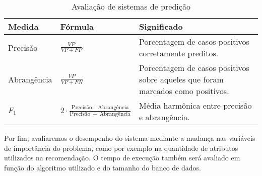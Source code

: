 

\begin{table}[htp]
\begin{center}
    \caption{Avaliação de sistemas de predição}
    \label{tab:avaliacao-predicao}
    \begin{tabular}{  | >{\arraybackslash} m{3cm} | >{\centering\arraybackslash} m{4cm} | >{\arraybackslash} m{6cm} | }
    \hline
    \textbf{Medida} & \textbf{Fórmula} & \textbf{Significado} \\ \hline
    Precisão &  $\frac{VP}{VP+FP}$ & Porcentagem de casos positivos corretamente preditos. \\ \hline                            
    Abrangência & $\frac{VP}{VP+FN}$ & Porcentagem de casos positivos sobre aqueles que foram marcados como positivos. \\ \hline
    $F_1$ &  $2 \cdot \frac{\mathrm{Precisão}~\cdot~\mathrm{Abrangência}}{\mathrm{Precisão}~+~\mathrm{Abrangência}}$ & Média harmônica entre precisão e abrangência. \\ \hline
    \end{tabular}
\end{center}
\end{table}

Por fim, avaliaremos o desempenho do sistema mediante a mudança nas variáveis de importância do problema, como por exemplo na quantidade de atributos utilizados na recomendação. O tempo de execução também será avaliado em função do algoritmo utilizado e do tamanho do banco de dados.

